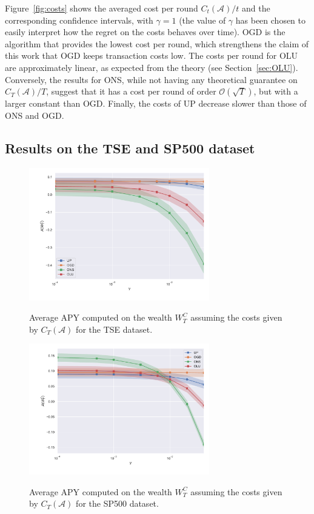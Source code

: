 Figure~\ref{fig:costs} shows the averaged cost per round $C_t(\mathcal{A})/t$ and the corresponding confidence intervals, with $\gamma = 1$ (the value of $\gamma$ has been chosen to easily interpret how the regret on the costs behaves over time).
OGD is the algorithm that provides the lowest cost per round, which strengthens the claim of this work that OGD keeps transaction costs low.
The costs per round for OLU are approximately linear, as expected from the theory (see Section~\ref{sec:OLU}).
Conversely, the results for ONS, while not having any theoretical guarantee on $C_T(\mathcal{A})/T$, suggest that it has a cost per round of order $\mathcal{O}(\sqrt{T})$, but with a larger constant than OGD.
Finally, the costs of UP decrease slower than those of ONS and OGD.

\subsection{Results on the TSE and SP500 dataset}

\begin{figure}[ht!]
\centering
{\includegraphics[width=0.70\textwidth,keepaspectratio]{img/fig_w_decay_l1_tse.pdf}} 
\caption{Average APY computed on the wealth $W_T^C$ assuming the costs given by $C_T(\mathcal{A})$ for the TSE dataset.}
\label{fig:wealth_decay_l1_tse}
\end{figure}

\begin{figure}[ht!]
\centering
{\includegraphics[width=0.70\textwidth,keepaspectratio]{img/fig_w_decay_l1_sp500.pdf}} 
\caption{Average APY computed on the wealth $W_T^C$ assuming the costs given by $C_T(\mathcal{A})$ for the SP500 dataset.}
\label{fig:wealth_decay_l1_sp500}
\end{figure}

